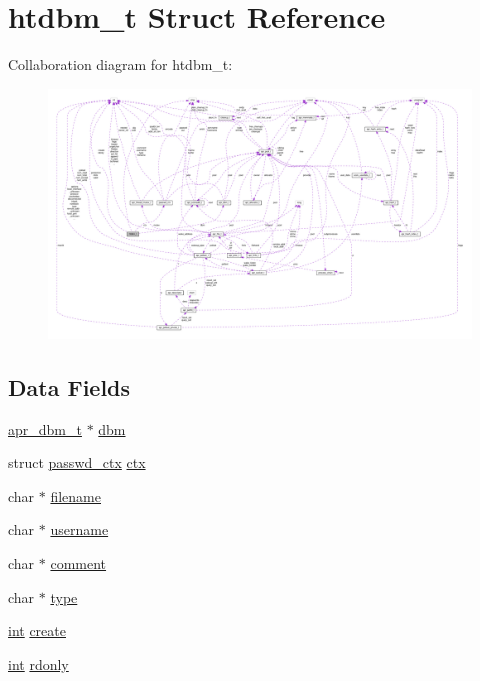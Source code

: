 \hypertarget{structhtdbm__t}{}\section{htdbm\+\_\+t Struct Reference}
\label{structhtdbm__t}


Collaboration diagram for htdbm\+\_\+t\+:
\nopagebreak
\begin{figure}[H]
\begin{center}
\leavevmode
\includegraphics[width=350pt]{structhtdbm__t__coll__graph}
\end{center}
\end{figure}
\subsection*{Data Fields}
\begin{DoxyCompactItemize}
\item 
\hyperlink{structapr__dbm__t}{apr\+\_\+dbm\+\_\+t} $\ast$ \hyperlink{structhtdbm__t_ac8921880be36097eb9297df6f72962bc}{dbm}
\item 
struct \hyperlink{structpasswd__ctx}{passwd\+\_\+ctx} \hyperlink{structhtdbm__t_af77f060240e0d260df642131cbe820ff}{ctx}
\item 
char $\ast$ \hyperlink{structhtdbm__t_ae236b5391f19a7ea30b90fbb0e5b9eab}{filename}
\item 
char $\ast$ \hyperlink{structhtdbm__t_af3d5a56ebe3bcaeef251f263e0920f04}{username}
\item 
char $\ast$ \hyperlink{structhtdbm__t_ae1b3014537f8f3ed33889f2163a51b1a}{comment}
\item 
char $\ast$ \hyperlink{structhtdbm__t_a069978739410de95a850685eb3780c11}{type}
\item 
\hyperlink{pcre_8txt_a42dfa4ff673c82d8efe7144098fbc198}{int} \hyperlink{structhtdbm__t_a02ef409d5c643c9c028c9ab5cf086621}{create}
\item 
\hyperlink{pcre_8txt_a42dfa4ff673c82d8efe7144098fbc198}{int} \hyperlink{structhtdbm__t_a74269b1cd8fc1e62a655c89a0d328fa1}{rdonly}
\end{DoxyCompactItemize}


